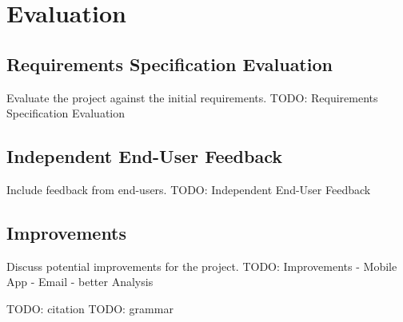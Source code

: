 \chapter{Evaluation}

\section{Requirements Specification Evaluation}
Evaluate the project against the initial requirements.
TODO: Requirements Specification Evaluation

\section{Independent End-User Feedback}
Include feedback from end-users.
TODO: Independent End-User Feedback

\section{Improvements}
Discuss potential improvements for the project.
TODO: Improvements
- Mobile App
- Email
- better Analysis


TODO: citation
TODO: grammar

